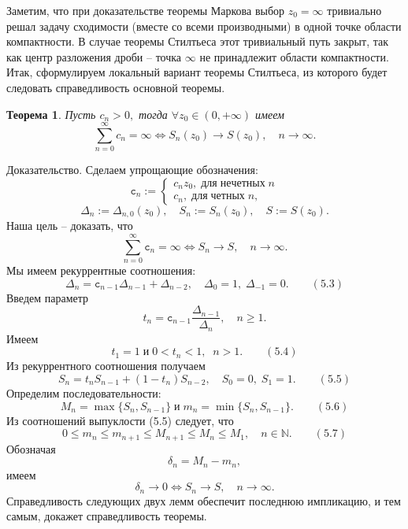 \documentclass[12 pt, a4 paper]{article}
\theoremstyle{plain}   \newtheorem{Pro}{Задача}
\newtheorem{The}{Теорема}
\begin{document}
Заметим, что при доказательстве теоремы Маркова выбор
$ z_0 =\infty $
тривиально решал задачу сходимости (вместе со всеми производными)
в одной точке области компактности.
В случае теоремы Стилтьеса этот тривиальный путь закрыт,
так как центр разложения дроби -- точка
$ \infty $
не принадлежит области компактности.\\
Итак, сформулируем локальный вариант теоремы Стилтьеса,
из которого будет следовать справедливость
основной теоремы.
\begin{The}
Пусть
$ c_n >0 , $
тогда
$ \forall z_0 \in (0,+\infty ) $
имеем
$$
  \sum _{n=0}^{\infty}c_n =\infty \Longleftrightarrow
    S_n (z_0 ) \longrightarrow S(z_0 ),
	  \quad n \rightarrow \infty .
$$
\end{The}
{\Large Доказательство.}
Сделаем упрощающие обозначения:
\begin{equation*}
  \mathtt{c}_n:=
    \begin{cases}
	  c_n z_0 , \; \mathrm{для} \; \mathrm{нечетных} \; n \\
	  c_n , \; \mathrm{для} \; \mathrm{четных} \; n ,
	\end{cases}
\end{equation*}
$$
  \Delta _n :=\Delta _{n,0}(z_0 ), \quad
    S_n :=S_n (z_0 ), \quad
	  S:= S(z_0 ).
$$
Наша цель -- доказать, что
$$
  \sum _{n=0}^{\infty}\mathtt{c}_n =\infty
    \Longleftrightarrow S_n \longrightarrow S,
	  \quad n \rightarrow \infty .
$$
Мы имеем рекуррентные соотношения:
$$
  \Delta _n =\mathtt{c}_{n-1} \Delta _{n-1}+
    \Delta _{n-2} , \quad
	  \Delta _0 =1, \; \Delta _{-1}=0.
	    \qquad (5.3)
$$
Введем параметр
$$
  t_n =\mathtt{c}_{n-1}
    \frac{\Delta _{n-1}}{\Delta _n},
	  \quad n \geqslant 1.
$$
Имеем
$$
  t_1 =1 \; \mathrm{и} \; 0<t_n <1, \; \; n>1.
    \qquad (5.4)
$$
Из рекуррентного соотношения получаем
$$
  S_n =t_n S_{n-1}+(1-t_n )S_{n-2},
    \quad S_0 =0, \; S_1 =1 .
	  \qquad (5.5)
$$
Определим последовательности:
$$
  M_n = \max \{ S_n ,S_{n-1} \}  \; \mathrm{и} \;
    m_n = \min \{ S_n , S_{n-1} \} .
	  \qquad (5.6)
$$
Из соотношений выпуклости (5.5) следует, что
$$
  0 \leqslant m_n \leqslant m_{n+1} \leqslant
    M_{n+1} \leqslant M_n \leqslant M_1 ,
	  \quad n \in \mathbb{N} .
	    \qquad (5.7)
$$			  	  		  			  	
Обозначая
$$
  \delta _n =M_n -m_n ,
$$
имеем
$$
  \delta _n \longrightarrow 0
    \Longleftrightarrow
	  S_n \longrightarrow S ,
	    \quad n \rightarrow \infty .
$$
Справедливость следующих двух лемм обеспечит последнюю импликацию,
и тем самым, докажет справедливость теоремы.
\end{document}
